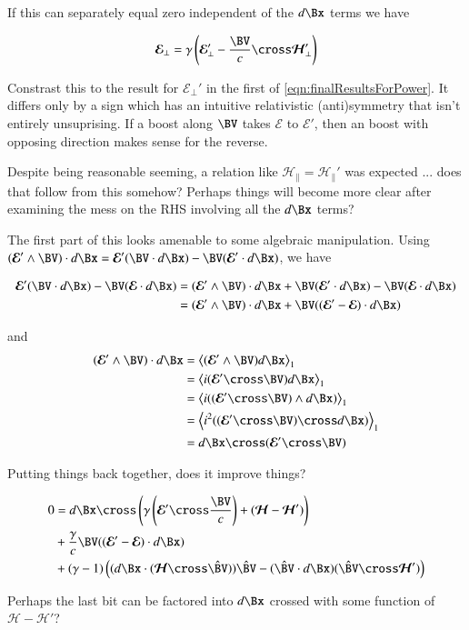 \documentclass{article}
\newcommand{\EE}[0]{\boldsymbol{\mathcal{E}}}
\newcommand{\HH}[0]{\boldsymbol{\mathcal{H}}}
\newcommand{\Vcap}[0]{\hat{\BV}}
\begin{document}
If this can separately equal zero independent of the $d\Bx$ terms we have

\begin{align}
\EE_\perp = \gamma \left( \EE_\perp' - \frac{\BV}{c} \cross \HH_\perp' \right)
\end{align}

Constrast this to the result for $\EE_\perp'$ in the first of \ref{eqn:finalResultsForPower}.  It differs only by
a sign which has an intuitive relativistic (anti)symmetry that isn't entirely unsuprising.  If a boost along $\BV$
takes $\EE$ to $\EE'$, then an boost with opposing direction makes sense for the reverse.  

Despite being reasonable seeming, a relation like $\HH_\parallel = \HH_\parallel'$ was expected ... does that follow from this somehow?
Perhaps things will become more clear after examining the mess on the RHS involving all the $d\Bx$ terms?

The first part of this looks amenable to some algebraic manipulation.  Using
$(\EE' \wedge \BV) \cdot d\Bx = \EE' (\BV \cdot d\Bx) - \BV (\EE' \cdot d\Bx)$, we have

\begin{align*}
\EE' (\BV \cdot d\Bx ) - \BV ( \EE \cdot d\Bx )  
&=
(\EE' \wedge \BV) \cdot d\Bx + \BV (\EE' \cdot d\Bx) - \BV ( \EE \cdot d\Bx ) \\
&=
(\EE' \wedge \BV) \cdot d\Bx + \BV ((\EE' - \EE) \cdot d\Bx) \\
\end{align*}

and
\begin{align*}
(\EE' \wedge \BV) \cdot d\Bx 
&=
\gpgradeone{ (\EE' \wedge \BV) d\Bx } \\
&=
\gpgradeone{ i(\EE' \cross \BV) d\Bx } \\
&=
\gpgradeone{ i ((\EE' \cross \BV) \wedge d\Bx) } \\
&=
\gpgradeone{ i^2 ((\EE' \cross \BV) \cross d\Bx) } \\
&=
d\Bx \cross (\EE' \cross \BV) 
\end{align*}

Putting things back together, does it improve things?

\begin{align*}
0 &=
{d\Bx} \cross \left(
{\gamma} \left(\EE' \cross \frac{\BV}{c} \right) 
+ (\HH -\HH')
\right) \\
&+\frac{\gamma}{c} \BV ((\EE' - \EE) \cdot d\Bx)  \\
%
&+ (\gamma-1)
\left(
( d\Bx \cdot (\HH \cross \Vcap) ) \Vcap - (\Vcap \cdot d\Bx) (\Vcap \cross \HH') 
\right) \\
\end{align*}

Perhaps the last bit can be factored into $d\Bx$ crossed with some function of $\HH - \HH'$?



\end{document}
